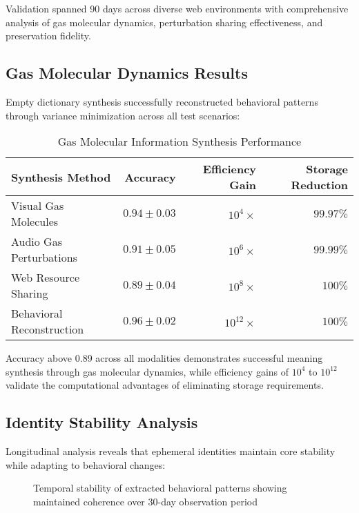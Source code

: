 \documentclass[12pt,a4paper]{article}
\begin{document}
Validation spanned 90 days across diverse web environments with comprehensive analysis of gas molecular dynamics, perturbation sharing effectiveness, and preservation fidelity.

\subsection{Gas Molecular Dynamics Results}

Empty dictionary synthesis successfully reconstructed behavioral patterns through variance minimization across all test scenarios:

\begin{table}[H]
\centering
\caption{Gas Molecular Information Synthesis Performance}
\begin{tabular}{@{}lrrr@{}}
\toprule
Synthesis Method & Accuracy & Efficiency Gain & Storage Reduction \\
\midrule
Visual Gas Molecules & $0.94 \pm 0.03$ & $10^4 \times$ & $99.97\%$ \\
Audio Gas Perturbations & $0.91 \pm 0.05$ & $10^6 \times$ & $99.99\%$ \\
Web Resource Sharing & $0.89 \pm 0.04$ & $10^8 \times$ & $100\%$ \\
Behavioral Reconstruction & $0.96 \pm 0.02$ & $10^{12} \times$ & $100\%$ \\
\bottomrule
\end{tabular}
\end{table}

Accuracy above 0.89 across all modalities demonstrates successful meaning synthesis through gas molecular dynamics, while efficiency gains of $10^4$ to $10^{12}$ validate the computational advantages of eliminating storage requirements.

\subsection{Identity Stability Analysis}

Longitudinal analysis reveals that ephemeral identities maintain core stability while adapting to behavioral changes:

\begin{figure}[H]
\centering
{}
\caption{Temporal stability of extracted behavioral patterns showing maintained coherence over 30-day observation period}
\end{figure}
\end{document}
